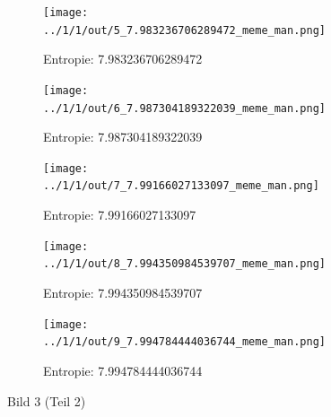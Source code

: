 \begin{figure}
	\centering

	\begin{subfigure}{0.25\textwidth}
		\texttt{[image: ../1/1/out/5\_7.983236706289472\_meme\_man.png]}
		\caption{Entropie: 7.983236706289472}
	\end{subfigure}

	\begin{subfigure}{0.25\textwidth}
		\texttt{[image: ../1/1/out/6\_7.987304189322039\_meme\_man.png]}
		\caption{Entropie: 7.987304189322039}
	\end{subfigure}

	\begin{subfigure}{0.25\textwidth}
		\texttt{[image: ../1/1/out/7\_7.99166027133097\_meme\_man.png]}
		\caption{Entropie: 7.99166027133097}
	\end{subfigure}

	\begin{subfigure}{0.25\textwidth}
		\texttt{[image: ../1/1/out/8\_7.994350984539707\_meme\_man.png]}
		\caption{Entropie: 7.994350984539707}
	\end{subfigure}

	\begin{subfigure}{0.25\textwidth}
		\texttt{[image: ../1/1/out/9\_7.994784444036744\_meme\_man.png]}
		\caption{Entropie: 7.994784444036744}
	\end{subfigure}

	\caption{Bild 3 (Teil 2)}
\end{figure}

